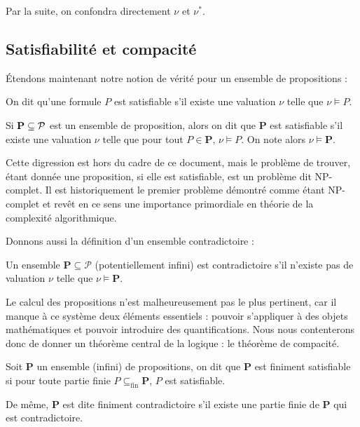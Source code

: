 Par la suite, on confondra directement $\nu$ et $\nu^*$.

\subsection{Satisfiabilité et compacité}

\'Etendons maintenant notre notion de vérité pour un ensemble de propositions :

\begin{defi}[Satisfiabilité]
    On dit qu'une formule $P$ est satisfiable s'il existe une valuation $\nu$ telle que $\nu\models P$.

    Si $\mathbf{P}\subseteq \mathcal P$ est un ensemble de proposition, alors on dit que $\mathbf{P}$ est satisfiable s'il existe une valuation $\nu$ telle que pour tout $P\in\mathbf{P}$, $\nu\models P$. On note alors $\nu\models \textbf{P}$.
\end{defi}

\begin{rmk}
    Cette digression est hors du cadre de ce document, mais le problème de trouver, étant donnée une proposition, si elle est satisfiable, est un problème dit NP-complet. Il est historiquement le premier problème démontré comme étant NP-complet et revêt en ce sens une importance primordiale en théorie de la complexité algorithmique.
\end{rmk}

Donnons aussi la définition d'un ensemble contradictoire :

\begin{defi}
    Un ensemble $\mathbf P\subseteq \mathcal P$ (potentiellement infini) est contradictoire s'il n'existe pas de valuation $\nu$ telle que $\nu\models \mathbf P$.
\end{defi}

Le calcul des propositions n'est malheureusement pas le plus pertinent, car il manque à ce système deux éléments essentiels : pouvoir s'appliquer à des objets mathématiques et pouvoir introduire des quantifications. Nous nous contenterons donc de donner un théorème central de la logique : le théorème de compacité.

\begin{defi}
    Soit $\mathbf{P}$ un ensemble (infini) de propositions, on dit que $\mathbf{P}$ est finiment satisfiable si pour toute partie finie $P\subseteq_{\mathrm{fin}}\mathbf P$, $P$ est satisfiable.
    
    De même, $\mathbf P$ est dite finiment contradictoire s'il existe une partie finie de $\mathbf P$ qui est contradictoire.
\end{defi}

